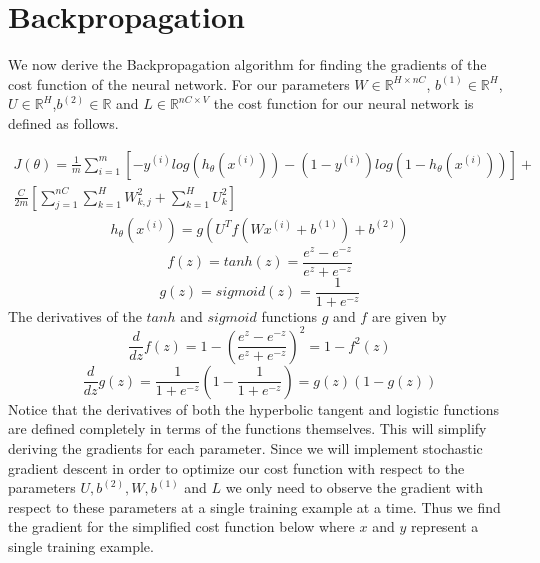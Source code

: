 \documentclass{article}
\begin{document}
\section{Backpropagation}
We now derive the Backpropagation algorithm for finding the gradients of the cost function of the neural network.  For our parameters \(W\in\mathbb{R}^{H \times nC}\), \( b^{(1)} \in\mathbb{R}^H\), \(U\in\mathbb{R}^H\),\( b^{(2)} \in\mathbb{R}\) and \(L\in\mathbb{R}^{nC \times V}\) the cost function for our neural network is defined as follows.

\begin{equation}
\begin{split}
J(\theta) = \frac{1}{m} \sum_{i=1}^m \left[-y ^{(i)} log(h_{\theta}(x^{(i)}))-(1-y^{(i)})log(1-h_{\theta}(x^{(i)}))\right]+\\ \frac{C}{2m} \left[ \sum_{j=1}^{nC} \sum_{k=1}^H W_{k,j}^2 + \sum_{k=1}^H U_{k}^2\right]
\end{split}
\end{equation}
\begin{equation}
\begin{split}
h_{\theta}(x^{(i)}) = g\left(U^Tf\left(Wx^{(i)}+b^{(1)}\right)+b^{(2)}\right)
\end{split}
\end{equation}
\begin{equation}
f(z) = tanh(z) = \frac{e^z - e^{-z}}{e^z + e^{-z}}
\end{equation}
\begin{equation}
g(z) = sigmoid(z) = \frac{1}{1+e^{-z}}
\end{equation}
The derivatives of the \(tanh\) and \(sigmoid\) functions \(g\) and \(f\) are given by
\begin{equation}\label{tanhderiv}
\frac{d}{dz}f(z) = 1 - \left(\frac{e^z-e^{-z}}{e^z+e^{-z}}\right)^2 = 1- f^2(z)
\end{equation}
\begin{equation}\label{sigderiv}
\frac{d}{dz}g(z) = \frac{1}{1+e^{-z}}\left(1 - \frac{1}{1+e^{-z}}\right) = g(z)(1-g(z))
\end{equation}
Notice that the derivatives of both the hyperbolic tangent and logistic functions are defined completely in terms of the functions themselves.  This will simplify deriving the gradients for each parameter.  Since we will implement stochastic gradient descent in order to optimize our cost function with respect to the parameters \(U, b^{(2)}, W, b^{(1)}\) and \(L\) we only need to observe the gradient with respect to these parameters at a single training example at a time.  Thus we find the gradient for the simplified cost function below where \(x\) and \(y\) represent a single training example.
\end{document}
